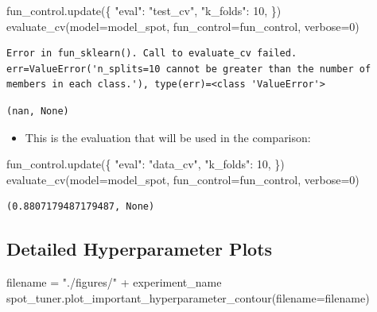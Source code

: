 \documentclass[
  letterpaper,
  DIV=11,
  numbers=noendperiod]{scrreprt}
\newenvironment{Shaded}{\begin{snugshade}}{\end{snugshade}}
\newcommand{\DecValTok}[1]{\textcolor[rgb]{0.68,0.00,0.00}{#1}}
\newcommand{\NormalTok}[1]{\textcolor[rgb]{0.00,0.23,0.31}{#1}}
\newcommand{\OperatorTok}[1]{\textcolor[rgb]{0.37,0.37,0.37}{#1}}
\newcommand{\StringTok}[1]{\textcolor[rgb]{0.13,0.47,0.30}{#1}}
\providecommand{\tightlist}{%
  \setlength{\itemsep}{0pt}\setlength{\parskip}{0pt}}\usepackage{longtable,booktabs,array}
\begin{document}
\begin{Shaded}
\begin{Highlighting}[]
\NormalTok{fun\_control.update(\{}
     \StringTok{"eval"}\NormalTok{: }\StringTok{"test\_cv"}\NormalTok{,}
     \StringTok{"k\_folds"}\NormalTok{: }\DecValTok{10}\NormalTok{,}
\NormalTok{\})}
\NormalTok{evaluate\_cv(model}\OperatorTok{=}\NormalTok{model\_spot, fun\_control}\OperatorTok{=}\NormalTok{fun\_control, verbose}\OperatorTok{=}\DecValTok{0}\NormalTok{)}
\end{Highlighting}
\end{Shaded}

\begin{verbatim}
Error in fun_sklearn(). Call to evaluate_cv failed. err=ValueError('n_splits=10 cannot be greater than the number of members in each class.'), type(err)=<class 'ValueError'>
\end{verbatim}

\begin{verbatim}
(nan, None)
\end{verbatim}

\begin{itemize}
\tightlist
\item
  This is the evaluation that will be used in the comparison:
\end{itemize}

\begin{Shaded}
\begin{Highlighting}[]
\NormalTok{fun\_control.update(\{}
     \StringTok{"eval"}\NormalTok{: }\StringTok{"data\_cv"}\NormalTok{,}
     \StringTok{"k\_folds"}\NormalTok{: }\DecValTok{10}\NormalTok{,}
\NormalTok{\})}
\NormalTok{evaluate\_cv(model}\OperatorTok{=}\NormalTok{model\_spot, fun\_control}\OperatorTok{=}\NormalTok{fun\_control, verbose}\OperatorTok{=}\DecValTok{0}\NormalTok{)}
\end{Highlighting}
\end{Shaded}

\begin{verbatim}
(0.8807179487179487, None)
\end{verbatim}

\hypertarget{detailed-hyperparameter-plots-3}{%
\subsection{Detailed Hyperparameter
Plots}\label{detailed-hyperparameter-plots-3}}

\begin{Shaded}
\begin{Highlighting}[]
\NormalTok{filename }\OperatorTok{=} \StringTok{"./figures/"} \OperatorTok{+}\NormalTok{ experiment\_name}
\NormalTok{spot\_tuner.plot\_important\_hyperparameter\_contour(filename}\OperatorTok{=}\NormalTok{filename)}
\end{Highlighting}
\end{Shaded}
\end{document}
